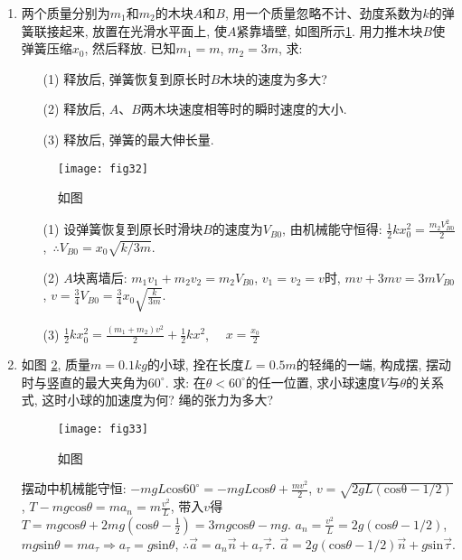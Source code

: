 \begin{enumerate}
    \item 两个质量分别为$m_1$和$m_2$的木块$A$和$B$, 用一个质量忽略不计、劲度系数为$k$的弹簧联接起来, 放置在光滑水平面上, 使$A$紧靠墙壁, 如图所示\ref{Fig:32}. 用力推木块$B$使弹簧压缩$x_0$,
    然后释放. 已知$m_1=m$, $m_2 = 3m$, 求:
    \begin{enumerate}
        \item[(1)] 释放后, 弹簧恢复到原长时$B$木块的速度为多大?
        \item[(2)] 释放后, $A$、$B$两木块速度相等时的瞬时速度的大小.
        \item[(3)] 释放后, 弹簧的最大伸长量.
    \end{enumerate}
    \begin{figure}[H]
        \centering
        \texttt{[image: fig32]}
            \caption{如图}\label{Fig:32}
    \end{figure}
    \begin{solution}
        \begin{enumerate}
            \item[(1)] 设弹簧恢复到原长时滑块$B$的速度为$V_{B0}$, 由机械能守恒得: $\frac{1}{2}kx_0^2=\frac{m_2V_{B0}^2}{2}$,\  $\therefore V_{B0}=x_0\sqrt{k/3m}$.
            \item[(2)]  $A$块离墙后: $m_1v_1+m_2v_2=m_2V_{B0}$, $v_1=v_2=v$时, $mv+3mv=3mV_{B0}$, $v=\frac{3}{4}V_{B0}=\frac{3}{4}x_0\sqrt{\frac{k}{3m}}$.
            \item[(3)] $\frac{1}{2}kx_0^2=\frac{(m_1+m_2)v^2}{2}+\frac{1}{2}kx^2$, \ \ $x=\frac{x_0}{2}$ 
        \end{enumerate}
    \end{solution}
    \item 如图 \ref{Fig:33}, 质量$m=0.1kg$的小球, 拴在长度$L=0.5m$的轻绳的一端, 构成摆, 摆动时与竖直的最大夹角为$60^\circ$. 求: 在$\theta<60^\circ$的任一位置, 求小球速度$V$与$\theta$的关系式, 
    这时小球的加速度为何? 绳的张力为多大?
    \begin{figure}[H]
        \centering
        \texttt{[image: fig33]}
            \caption{如图}\label{Fig:33}
    \end{figure}
    \begin{solution}
        摆动中机械能守恒: $-mgL\mathrm{cos}60^\circ = -mgL\mathrm{cos}\theta + \frac{mv^2}{2}$, $v=\sqrt{2gL(\mathrm{cos\theta-1/2})}$, $T-mg\mathrm{cos}\theta=ma_n=m\frac{v^2}{L}$, 带入$v$得
        $T=mg\mathrm{cos}\theta+2mg(\mathrm{cos}\theta-\frac{1}{2})=3mg\mathrm{cos}\theta-mg$.  $a_n=\frac{v^2}{L}=2g(\mathrm{cos}\theta-1/2)$, 
        $mg\mathrm{sin}\theta = ma_{\tau} \Longrightarrow a_{\tau} = g\mathrm{sin}\theta$, $\therefore \vec{a}=a_n\vec{n}+a_{\tau}\vec{\tau}$. $\vec{a}=2g(\mathrm{cos}\theta-1/2)\vec{n}+g\mathrm{sin}\vec{\tau}$.
    \end{solution}
\end{enumerate}
